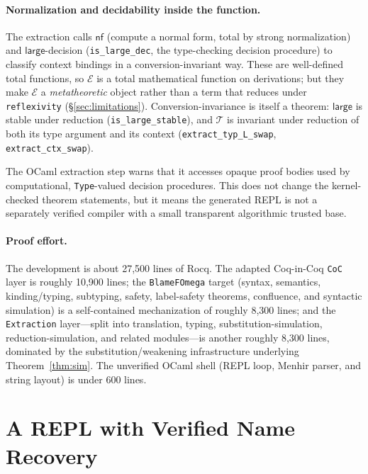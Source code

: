 \documentclass[acmsmall,anonymous=false,nonacm]{acmart}
\newcommand{\ext}{\mathcal{E}}
\newcommand{\extt}{\mathcal{T}}
\newcommand{\islarge}{\mathsf{large}}
\newcommand{\nf}{\mathsf{nf}}
\begin{document}
\paragraph{Normalization and decidability inside the function.}
The extraction calls $\nf$ (compute a normal form, total by strong
normalization) and $\islarge$-decision (\texttt{is\_large\_dec}, the type-checking
decision procedure) to classify context bindings in a conversion-invariant way.
These are well-defined total functions, so $\ext$ is a total mathematical
function on derivations; but they make $\ext$ a \emph{metatheoretic} object
rather than a term that reduces under \texttt{reflexivity}
(\S\ref{sec:limitations}). Conversion-invariance is itself a theorem:
$\islarge$ is stable under reduction (\texttt{is\_large\_stable}), and $\extt$ is
invariant under reduction of both its type argument and its context
(\texttt{extract\_typ\_L\_swap}, \texttt{extract\_ctx\_swap}).

The OCaml extraction step warns that it accesses opaque proof bodies used by
computational, \texttt{Type}-valued decision procedures. This does not change
the kernel-checked theorem statements, but it means the generated REPL is not a
separately verified compiler with a small transparent algorithmic trusted base.

\paragraph{Proof effort.}
The development is about 27{,}500 lines of Rocq. The adapted Coq-in-Coq
\texttt{CoC} layer is roughly 10{,}900 lines; the \texttt{BlameFOmega} target
(syntax, semantics, kinding/typing, subtyping, safety, label-safety theorems,
confluence, and syntactic simulation) is a self-contained mechanization of
roughly 8{,}300 lines; and the \texttt{Extraction} layer---split into
translation, typing, substitution-simulation, reduction-simulation, and
related modules---is another roughly 8{,}300 lines, dominated by the
substitution/weakening infrastructure underlying Theorem~\ref{thm:sim}. The
unverified OCaml shell (REPL loop, Menhir parser, and string layout) is under
600 lines.

\section{A REPL with Verified Name Recovery}\label{sec:repl}
\end{document}
